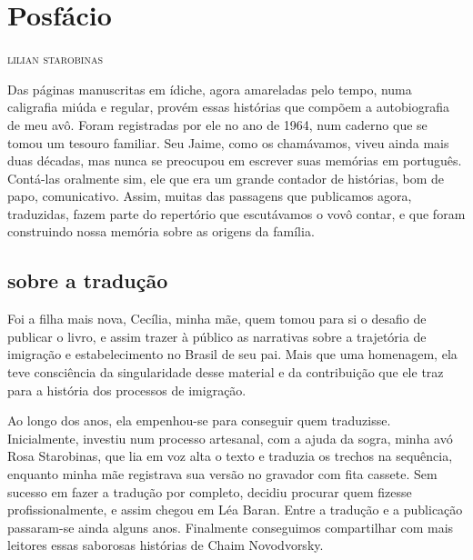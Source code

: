 \chapter*{Posfácio\smallskip{}}


\begin{flushright}
\textsc{lilian starobinas}
\end{flushright}\medskip

\noindent{}Das páginas manuscritas em ídiche, agora amareladas pelo tempo, numa
caligrafia miúda e regular, provém essas histórias que compõem a
autobiografia de meu avô. Foram registradas por ele no ano de 1964, num
caderno que se tomou um tesouro familiar. Seu Jaime, como os chamávamos,
viveu ainda mais duas décadas, mas nunca se preocupou em escrever suas
memórias em português. Contá-las oralmente sim, ele que era um grande
contador de histórias, bom de papo, comunicativo. Assim, muitas das
passagens que publicamos agora, traduzidas, fazem parte do repertório que
escutávamos o vovô contar, e que foram construindo nossa memória sobre
as origens da família.

\section{sobre a tradução}

Foi a filha mais nova, Cecília, minha mãe, quem tomou para si o desafio
de publicar o livro, e assim trazer à público as narrativas sobre a
trajetória de imigração e estabelecimento no Brasil de seu pai. Mais que
uma homenagem, ela teve consciência da singularidade desse material e da
contribuição que ele traz para a história dos processos de imigração.

Ao longo dos anos, ela empenhou-se para conseguir quem traduzisse.
Inicialmente, investiu num processo artesanal, com a ajuda da sogra,
minha avó Rosa Starobinas, que lia em voz alta o texto e traduzia os
trechos na sequência, enquanto minha mãe registrava sua versão no
gravador com fita cassete. Sem sucesso em fazer a tradução por completo,
decidiu procurar quem fizesse profissionalmente, e assim chegou em Léa
Baran. Entre a tradução e a publicação passaram-se ainda alguns anos.
Finalmente conseguimos compartilhar com mais leitores essas saborosas
histórias de Chaim Novodvorsky.

